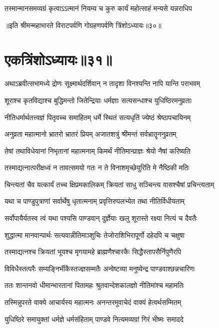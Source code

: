 \twolineshloka
{तस्मान्मानसमव्यग्रं कृत्वाऽऽत्मानं नियम्य च}
{कुरु कार्यं महोत्साहं मन्यसे यन्नराधिप}

॥इति श्रीमन्महाभारते विराटपर्वणि गोग्रहणपर्वणि त्रिंशोऽध्यायः॥३०॥

\chapter{एकत्रिंशोऽध्यायः॥३१॥}

\twolineshloka
{अथाऽब्रवीत्सभामध्ये द्रोणः सूक्ष्मार्थदर्शिवान्}
{न तादृशा विनश्यन्ति नापि यान्ति पराभवम्}


\twolineshloka
{शूराश्च कृतविद्याश्च बुद्धिमन्तो जितेन्द्रियाः}
{धर्मज्ञाः सत्यसन्धाश्च युधिष्ठिरमनुव्रताः}


\twolineshloka
{नीतिधर्मार्थतत्त्वज्ञं पितृवच्च समाहितम्}
{धर्मे स्थितं सत्यधृतिं ज्येष्ठं श्रेष्ठापचायिनम्}


\twolineshloka
{अनुव्रता महात्मानो भ्रातरो भ्रातरं प्रियम्}
{अजातशत्रुं श्रीमन्तं सर्वभ्रातॄननुव्रतम्}


\twolineshloka
{तेषां तथाविधेयानां निभृतानां महात्मनाम्}
{किमर्थं नीतिमान्प्राज्ञः श्रेयो नैषां करिष्यति}


\twolineshloka
{तस्माद्यत्नात्परीक्षध्वं न तावत्समयो गतः}
{न ते विनाशमृच्छेयुरिति मे नैष्ठिकी मतिः}


\twolineshloka
{चिन्त्यतां चैव यत्कार्यं तच्च क्षिप्रमकालिकम्}
{क्रियतां साधु सञ्चिन्त्य वासश्चैषां प्रचिन्त्यताम्}


\twolineshloka
{यथा च पाण्डुपुत्राणां सर्वार्थेषु धृतात्मनाम्}
{प्रवृत्तिरुपलभ्येत तथा नीतिर्विधीयताम्}


\twolineshloka
{सर्वोपायैर्यतस्व त्वं यथा पश्यसि पाण्डवान्}
{दुर्ज्ञेयाः खलु शूरास्ते रक्ष्या नित्यं च दैवतैः}


\twolineshloka
{शुद्धात्मा मानवान्पार्थः सत्यवान्नीतिमाञ्शुचिः}
{तेजोराशिभिरापूर्णो दहेदपि च चक्षुषा}


\twolineshloka
{तस्माद्यत्नश्च क्रियतां भूयश्च मृगयामहे}
{ब्राह्मणैश्चारकैः सिद्धैस्तापसैर्निपुणैरपि}


\twolineshloka
{विविधैस्तत्परैः सम्यङ्निर्भीकैस्तज्ज्ञसम्मतैः}
{अन्वेष्टव्या मनुष्येन्द्र पाण्डवाश्छन्नचारिणः}


\twolineshloka
{ततः शान्तनवो धीमान्भारतानां पितामहः}
{श्रुतवान्देशकालज्ञो नीतिमांश्च महामतिः}


\twolineshloka
{तस्मिन्नुपरते वाक्ये आचार्यस्य महात्मनः}
{अनन्तरमुवाचेदं वाक्यं हेत्वर्थसम्मितम्}


\twolineshloka
{युधिष्ठिरे समायुक्तां धर्मज्ञे धर्मसंहिताम्}
{पाण्डवे नित्यमव्यग्रां गिरं भीष्मः समाददे}


